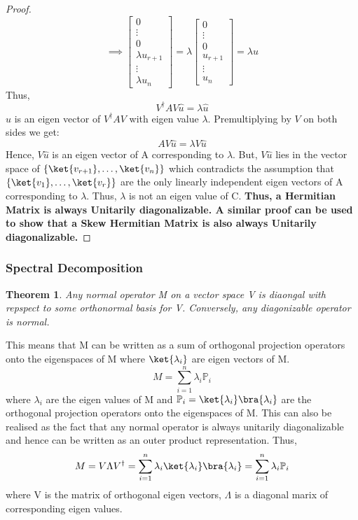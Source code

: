\documentclass[12pt, oneside]{book}
\newtheorem{theorem}{Theorem}[section]
\theoremstyle{definition}
\theoremstyle{definition}
\theoremstyle{remark}
\begin{document}
\begin{proof}
    \[ \implies \begin{bmatrix} 0 \\ \vdots \\ 0 \\ \lambda u_{r+1} \\ \vdots \\ \lambda u_n \end{bmatrix}=\lambda \begin{bmatrix} 0 \\ \vdots \\ 0 \\ u_{r+1} \\ \vdots \\ u_n \end{bmatrix} = \lambda \hat{u} \]
    Thus, 
    \[V^{\dagger}AV\hat{u}=\lambda \hat{u}\] 
    $\hat{u}$ is an eigen vector of $V^{\dagger}AV$ with eigen value $\lambda$.
    Premultiplying by $V$ on both sides we get:
    \[AV\hat{u}=\lambda V\hat{u}\]
    Hence, $V\hat{u}$ is an eigen vector of A corresponding to $\lambda$. But, 
    $V\hat{u}$ lies in the vector space of $\{\ket{v_{r+1}}, \ldots, \ket{v_n}\}$ which contradicts the assumption that 
    $\{\ket{v_1},\ldots,\ket{v_r}\}$ are the only linearly independent eigen vectors of A corresponding to $\lambda$. Thus, $\lambda$ is not an eigen value of C.
    \textbf{Thus, a Hermitian Matrix is always Unitarily diagonalizable. A similar proof can be used to show that a Skew Hermitian Matrix is also always Unitarily diagonalizable.}  
\end{proof}

\subsubsection{Spectral Decomposition}
\begin{theorem} 
    Any normal operator M on a vector space V is diaongal with repspect to some orthonormal basis for V. 
    Conversely, any diagonizable operator is normal.
\end{theorem}
This means that M can be written as a sum of orthogonal projection operators onto the eigenspaces of M where $\ket{\lambda_i}$ are 
eigen vectors of M.
\[ M=\sum_{i=1}^n \lambda_i \mathbb{P}_i \]
where $\lambda_i$ are the eigen values of M and 
$\mathbb{P}_i = \ket{\lambda_i}\bra{\lambda_i}$ are the orthogonal projection operators onto the eigenspaces of M. 
This can also be realised as the fact that any normal operator is always unitarily diagonalizable and hence can be written as
an outer product representation. Thus, 
\[M = V\Lambda V^{\dagger} = \sum_{i=1}^n \lambda_i \ket{\lambda_i}\bra{\lambda_i} = \sum_{i=1}^n \lambda_i \mathbb{P}_i \]
where V is the matrix of orthogonal eigen vectors, $\Lambda$ is a diagonal marix of corresponding eigen values.
\end{document}
